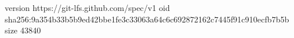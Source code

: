version https://git-lfs.github.com/spec/v1
oid sha256:9a354b33b5b9ed42bbe1fe3c33063a64c6c692872162c7445f91c910ecfb7b5b
size 43840
